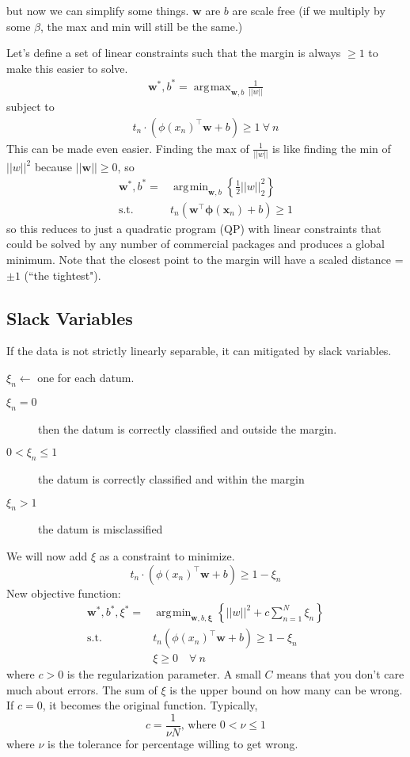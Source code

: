 \documentclass[11pt, oneside]{article}   	%
\DeclareMathOperator*{\argmin}{\arg\!\min}
\DeclareMathOperator*{\argmax}{\arg\!\max}
\begin{document}
but now we can simplify some things. $\mathbf{w}$ are $b$ are scale free (if we multiply by some $\beta$, the max and min will still be the same.)

Let's define a set of linear constraints such that the margin is always $\ge 1$ to make this easier to solve.
\begin{align}
\mathbf{w}^*,b^*= \argmax_{\mathbf{w},b}\frac{1}{||w||}
\end{align}
subject to 
\begin{align}
t_n\cdot(\phi(x_n)^\intercal\mathbf{w}+b) \ge 1 \:\forall\: n
\end{align}
This can be made even easier. Finding the max of $\frac{1}{||w||}$ is like finding the min of $||w||^2$ because $||\mathbf{w}|| \ge 0$, so
\begin{align}
\mathbf{w}^*,b^*=& \argmin_{\mathbf{w},b} \left\{\frac{1}{2}||w||_2^2 \right\}\\
\text{s.t.} \:& t_n(\mathbf{w}^\intercal \boldsymbol{\phi}(\mathbf{x}_n) + b) \ge 1
\end{align}
so this reduces to just a quadratic program (QP) with linear constraints that could be solved by any number of commercial packages and produces a global minimum. Note that the closest point to the margin will have a scaled distance = $\pm 1$ (``the tightest").

\subsection{Slack Variables}
If the data is not strictly linearly separable, it can mitigated by slack variables.

$\xi_n \leftarrow$ one for each datum. 
\begin{description}
 \item[$\xi_n = 0$] then the datum is correctly classified and outside the margin.
 \item[$0 < \xi_n \le 1$] the datum is correctly classified and within the margin
 \item[$\xi_n > 1$] the datum is misclassified
\end{description}

We will now add $\xi$ as a constraint to minimize.
\[
t_n\cdot(\phi(x_n)^\intercal\mathbf{w}+b) \ge 1 - \xi_n
\]
New objective function:
\begin{align}
\mathbf{w}^*,b^*,\xi^*=& \argmin_{\mathbf{w},b,\mathbf{\xi}}\left\{||w||^2+ c \sum_{n=1}^{N}\xi_n\right\}\\
\text{s.t.} \:& t_n(\phi(x_n)^\intercal\mathbf{w} + b) \ge 1 -\xi_n\\
& \xi \ge 0 \quad \forall \:n
\end{align}
where $c>0$ is the regularization parameter. A small $C$ means that you don't care much about errors. The sum of $\xi$ is the upper bound on how many can be wrong. If $c = 0$, it becomes the original function.
Typically,
\[
c=\frac{1}{\nu N} \text{, where } 0 < \nu \le 1
\]
where $\nu$ is the tolerance for percentage willing to get wrong.
\end{document}
